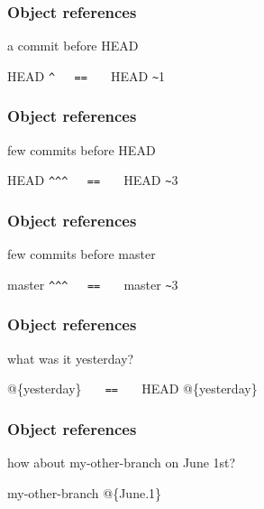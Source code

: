 \documentclass[english]{beamer}
\newcommand{\faint}[1]{%
\textcolor{code-gray}{#1}%
}
\begin{document}
\begin{frame}[fragile]
\frametitle{Object references}

a commit before HEAD

\vspace{.1\textheight}
\begin{center}
        \faint{HEAD}\verb!^   ==   ! \faint{HEAD}\verb!~!1
\end{center}

\end{frame}

\begin{frame}[fragile]
\frametitle{Object references}

few commits before HEAD

\vspace{.1\textheight}
\begin{center}
        \faint{HEAD}\verb!^^^   ==   ! \faint{HEAD}\verb!~!3
\end{center}

\end{frame}

\begin{frame}[fragile]
\frametitle{Object references}

few commits before master

\vspace{.1\textheight}
\begin{center}
        \faint{master}\verb!^^^   ==   ! \faint{master}\verb!~!3
\end{center}

\end{frame}

\begin{frame}[fragile]
\frametitle{Object references}

what was it yesterday?

\vspace{.1\textheight}
\begin{center}
        @\{yesterday\} \verb!   ==   ! \faint{HEAD}@\{yesterday\}
\end{center}

\end{frame}

\begin{frame}
\frametitle{Object references}

how about my-other-branch on June 1st?

\vspace{.1\textheight}
\begin{center}
        \faint{my-other-branch}@\{June.1\}
\end{center}

\end{frame}
\end{document}
